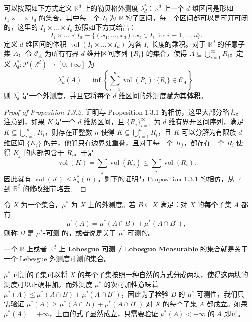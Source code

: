 \documentclass[11pt]{article}
\newcommand{\RR}{\mathbb{R}}
\newcommand{\calC}{\mathcal{C}}
\newcommand{\calP}{\mathcal{P}}
\newcommand{\vol}{\operatorname{vol}}
\begin{document}
\begin{proposition}
    可以按照如下方式定义 $\RR^d$ 上的勒贝格外测度 $\lambda_d^*$：$\RR^d$ 上一个 $d$ 维区间是形如 $I_1 \times \dots \times I_d$ 的集合，其中每一个 $I_i$ 为 $\RR$ 的子区间，每一个区间都可以是可开可闭的，这里的 $I_1 \times \dots \times I_d$ 按照如下方式给出：
    \[
        I_1 \times \dots \times I_d
        = \{(x_1,\dots,x_d): x_i \in I_i \text{ for } i=1,\dots,d\}.
    \]
    定义 $d$ 维区间的体积 $\vol(I_1 \times \dots \times I_d)$ 为各 $I_i$ 长度的乘积。对于 $\RR^d$ 的任意子集 $A$，令 $\calC_A$ 为所有有界 $d$ 维开区间序列 $\{R_i\}$ 的集合，使得 $A \subseteq \bigcup_{i=1}^{\infty} R_i$。定义 $\lambda_d^*:\calP(\RR^d)\to[0,+\infty]$ 为
    \[
        \lambda_d^*(A)
        = \inf\left\{\sum_{i=1}^{\infty}\vol(R_i): \{R_i\}\in \calC_A\right\}.
    \]
    则 $\lambda_d^*$ 是一个外测度，并且它将每个 $d$ 维区间的外测度赋为其{\normalfont\bfseries 体积}。
\end{proposition}

\begin{proof}[Proof of Proposition 1.3.2]
    证明与 Proposition 1.3.1 的相仿，这里大部分略去。注意到，如果 $K$ 是一个 $d$ 维紧区间，且 $\{R_i\}_{i=1}^{\infty}$ 为 $d$ 维有界开区间序列，满足 $K \subseteq \bigcup_{i=1}^{\infty} R_i$，则存在正整数 $n$ 使得 $K \subseteq \bigcup_{i=1}^n R_i$，且 $K$ 可以分解为有限族 $d$ 维区间 $\{K_j\}$ 的并，他们只在边界处重叠，且对于每一个 $K_j$，都存在一个 $R_i$ 使得 $K_j$ 的内部包含于 $R_i$。于是
    \[
        \vol(K) = \sum_j \vol(K_j) \le \sum_i \vol(R_i).
    \]
    因此就有 $\vol(K) \le \lambda_d^*(K)$。剩下的证明与 Proposition 1.3.1 的相仿，从 $\RR$ 到 $\RR^d$ 的修改细节略去。
\end{proof}

\begin{definition}
    令 $X$ 为一个集合，$\mu^*$ 为 $X$ 上的外测度。若 $B \subseteq X$ 满足：对 $X$ 的{\normalfont\bfseries 每个}子集 $A$ 都有
    \[
        \mu^*(A) = \mu^*(A\cap B) + \mu^*(A\cap B^c),
    \]
    则称 $B$ 是 {\normalfont\bfseries $\mu^*$-可测} 的，或者说是关于 $\mu^*$ 可测的。

    一个 $\RR$ 上或者 $\RR^d$ 上 {\normalfont\bfseries Lebesgue 可测 / Lebesgue Measurable} 的集合就是关于一个 Lebesgue 外测度可测的集合。
\end{definition}

$\mu^*$ 可测的子集可以将 $X$ 的每个子集按照一种自然的方式分成两块，使得这两块的测度可以正确相加。而外测度 $\mu^*$ 的次可加性意味着 $\mu^*(A)\le \mu^*(A\cap B)+\mu^*(A\cap B^c)$，因此为了检验 $B$ 的 $\mu^*$-可测性，我们只需验证 $\mu^*(A)\ge \mu^*(A\cap B)+\mu^*(A\cap B^c)$ 对 $X$ 的每个子集 $A$ 都成立。如果 $\mu^*(A)=+\infty$，上面的式子显然成立，只需要验证 $\mu^*(A)<+\infty$ 的 $A$ 即可。
\end{document}
